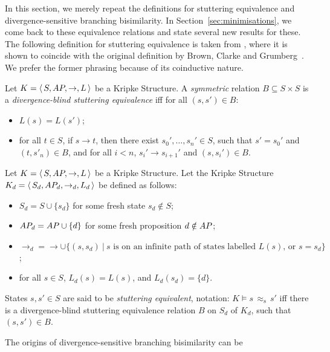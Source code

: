 \documentclass{llncs}
\newcommand{\kstrans}{\to}
\newcommand{\stuttering}{\,\approx_{\mathrm{s}}\,}
\begin{document}
In this section, we merely repeat the definitions for stuttering
equivalence and divergence-sensitive branching bisimilarity. In
Section~\ref{sec:minimisations}, we come back to these equivalence
relations and state several new results for these.\\

The following definition for stuttering equivalence is taken
from \cite{DBLP:journals/jacm/NicolaV95}, where it is shown to coincide
with the original definition by Brown, Clarke and Grumberg~\cite{DBLP:journals/tcs/BrowneCG88}.
We prefer the former phrasing because of its coinductive nature.
\begin{definition}
Let $K = \tuple{S, \AP, \kstrans, L}$ be a Kripke Structure. A
\emph{symmetric} relation $B \subseteq S \times S$ is a
\emph{divergence-blind stuttering equivalence} iff for all $(s,s') \in B$:
\begin{itemize}
\item $L(s) = L(s')$;
\item for all $t \in S$, if $s \kstrans t$, then there exist
$s_0',\ldots, s_n' \in S$, such that $s' = s_0'$ and $(t,s'_n) \in B$, and
for all $i < n$, $s_i' \kstrans s_{i+1}'$ and $(s,s_i') \in B$.
\end{itemize}
\end{definition}
\begin{definition} Let $K = \tuple{S, \AP, \kstrans, L}$ be a Kripke
Structure. Let the Kripke Structure $K_d = \tuple{S_d, \AP_d,
\kstrans_d, L_d}$ be defined as follows:
\begin{itemize}
\item $S_d = S \cup \{s_d\}$ for some fresh state $s_d \notin S$;

\item $AP_d = AP \cup \{d\}$ for some fresh proposition $d \notin AP$;

\item $\kstrans_d = \kstrans \cup \{(s,s_d) ~|~ \text{$s$ is on an
infinite path of states labelled $L(s)$, or $s=s_d$}\}$;

\item for all $s \in S$, $L_d(s) = L(s)$, and $L_d(s_d) = \{d\}$.

\end{itemize}
States $s, s' \in S$ are said to be \emph{stuttering equivalent},
notation: $K \models s \stuttering s'$ iff there is a divergence-blind
stuttering equivalence relation $B$ on $S_d$ of $K_d$, such that
$(s,s') \in B$.
\end{definition}
The origins of divergence-sensitive branching bisimilarity can be
\end{document}
